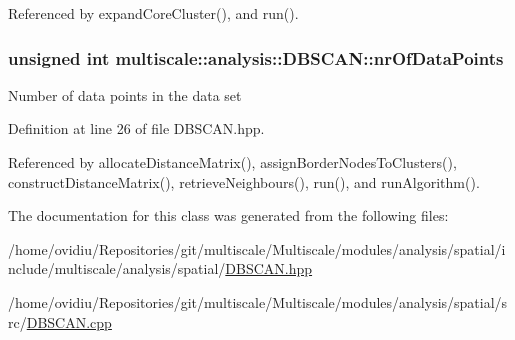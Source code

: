 \-Referenced by expand\-Core\-Cluster(), and run().

\hypertarget{classmultiscale_1_1analysis_1_1DBSCAN_af81a42ca24493494b3d20e27c76be016}{
\subsubsection[{nr\-Of\-Data\-Points}]{\setlength{\rightskip}{0pt plus 5cm}unsigned int {\bf multiscale\-::analysis\-::\-D\-B\-S\-C\-A\-N\-::nr\-Of\-Data\-Points}}}\label{classmultiscale_1_1analysis_1_1DBSCAN_af81a42ca24493494b3d20e27c76be016}
\-Number of data points in the data set 

\-Definition at line 26 of file \-D\-B\-S\-C\-A\-N.\-hpp.



\-Referenced by allocate\-Distance\-Matrix(), assign\-Border\-Nodes\-To\-Clusters(), construct\-Distance\-Matrix(), retrieve\-Neighbours(), run(), and run\-Algorithm().



\-The documentation for this class was generated from the following files\-:\begin{DoxyCompactItemize}
\item 
/home/ovidiu/\-Repositories/git/multiscale/\-Multiscale/modules/analysis/spatial/include/multiscale/analysis/spatial/\hyperlink{DBSCAN_8hpp}{\-D\-B\-S\-C\-A\-N.\-hpp}\item 
/home/ovidiu/\-Repositories/git/multiscale/\-Multiscale/modules/analysis/spatial/src/\hyperlink{DBSCAN_8cpp}{\-D\-B\-S\-C\-A\-N.\-cpp}\end{DoxyCompactItemize}
